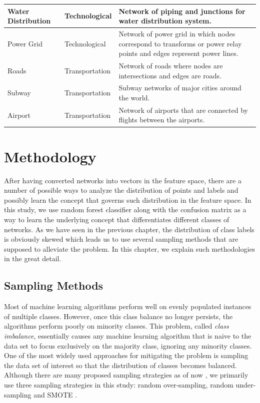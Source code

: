\documentclass{article}
\begin{document}
\begin{longtable}{| l | l | p{9cm} |}
      Water Distribution &  Technological & Network of piping and junctions for water distribution system.\\  \hline
      Power Grid &  Technological & Network of power grid in which nodes correspond to transforms or power relay points and edges represent power lines.\\  \hline
      Roads &  Transportation & Network of roads where nodes are intersections and edges are roads.\\  \hline
      Subway &  Transportation & Subway networks of major cities around the world.\\  \hline
      Airport &  Transportation & Network of airports that are connected by flights between the airports.\\  \hline
           
\end{longtable}


\newpage
\section{Methodology}
After having converted networks into vectors in the feature space, there are a number of possible ways to analyze the distribution of points and labels and possibly learn the concept that governs such distribution in the feature space. In this study, we use random forest classifier along with the confusion matrix as a way to learn the underlying concept that differentiates different classes of networks. As we have seen in the previous chapter, the distribution of class labels is obviously skewed which leads us to use several sampling methods that are supposed to alleviate the problem. In this chapter, we explain such methodologies in the great detail.

	\subsection{Sampling Methods}
Most of machine learning algorithms perform well on evenly populated instances of multiple classes. However, once this class balance no longer persists, the algorithms perform poorly on minority classes. This problem, called \textit{class imbalance}, essentially causes any machine learning algorithm that is naive to the data set to focus exclusively on the majority class, ignoring any minority classes. One of the most widely used approaches for mitigating the problem is sampling the data set of interest so that the distribution of classes becomes balanced. Although there are many proposed sampling strategies as of now \cite{SurveySampling}, we primarily use three sampling strategies in this study: random over-sampling, random under-sampling and SMOTE \cite{SMOTE}.
\end{document}
